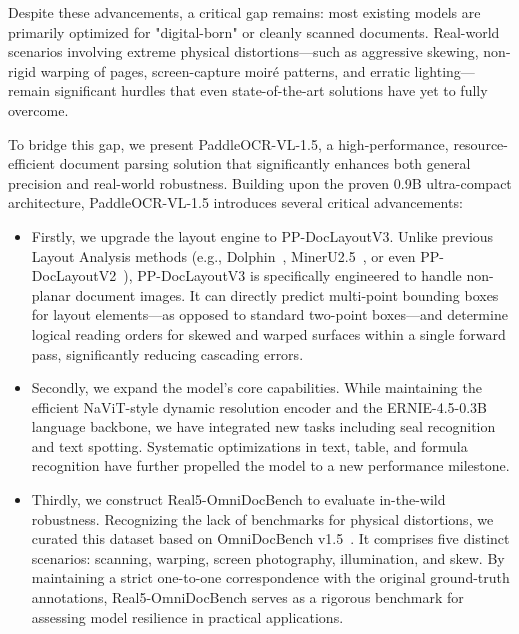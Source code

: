 \documentclass[11pt, a4paper,logo,  copyright, nonumbering]{paddleocr}
\begin{document}
Despite these advancements, a critical gap remains: most existing models are primarily optimized for "digital-born" or cleanly scanned documents. Real-world scenarios involving extreme physical distortions—such as aggressive skewing, non-rigid warping of pages, screen-capture moiré patterns, and erratic lighting—remain significant hurdles that even state-of-the-art solutions have yet to fully overcome.

To bridge this gap, we present PaddleOCR-VL-1.5, a high-performance, resource-efficient document parsing solution that significantly enhances both general precision and real-world robustness. Building upon the proven 0.9B ultra-compact architecture, PaddleOCR-VL-1.5 introduces several critical advancements:

\begin{itemize}
    \item Firstly, we upgrade the layout engine to PP-DocLayoutV3. Unlike previous Layout Analysis methods (e.g., Dolphin~\cite{feng2025dolphin}, MinerU2.5~\cite{niu2025mineru2}, or even PP-DocLayoutV2~\cite{sun2025pp}), PP-DocLayoutV3 is specifically engineered to handle non-planar document images. It can directly predict multi-point bounding boxes for layout elements—as opposed to standard two-point boxes—and determine logical reading orders for skewed and warped surfaces within a single forward pass, significantly reducing cascading errors.
    \item Secondly, we expand the model's core capabilities. While maintaining the efficient NaViT-style dynamic resolution encoder and the ERNIE-4.5-0.3B~\cite{ernie2025technicalreport} language backbone, we have integrated new tasks including seal recognition and text spotting. Systematic optimizations in text, table, and formula recognition have further propelled the model to a new performance milestone.
    \item Thirdly, we construct Real5-OmniDocBench to evaluate in-the-wild robustness. Recognizing the lack of benchmarks for physical distortions, we curated this dataset based on OmniDocBench v1.5~\cite{ouyang2025omnidocbench}. It comprises five distinct scenarios: scanning, warping, screen photography, illumination, and skew. By maintaining a strict one-to-one correspondence with the original ground-truth annotations, Real5-OmniDocBench serves as a rigorous benchmark for assessing model resilience in practical applications.
\end{itemize}
\end{document}
